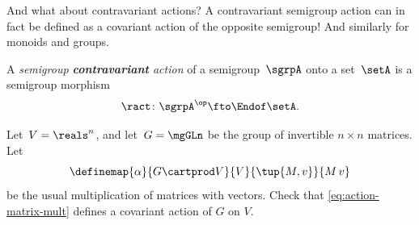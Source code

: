And what about contravariant actions? A contravariant semigroup action can in fact be defined as a covariant action of the opposite semigroup! And similarly for monoids and groups.

\begin{ctdefinition}
    \label{def:semigroup-cont-action}
    A \emph{semigroup \textbf{contravariant} action} of a semigroup~$\sgrpA$ onto a set~$\setA$ is a semigroup morphism
    \begin{equation}
        \ract \colon \sgrpA^{\op} \fto \Endof\setA.
    \end{equation}
\end{ctdefinition}


\begin{gradedexercise}
    \label{ex:MatrixMultAction}
    Let~$V = \reals^n$, and let~$G = \mgGLn$ be the group of invertible $n \times n$ matrices.
    Let
    \begin{equation}
        \label{eq:action-matrix-mult}
        \definemap{
            \alpha
        }{
            G \cartprod V
        }{
            V
        }{
            \tup{M, v}
        }{
            M \, v
        }
    \end{equation}
    be the usual multiplication of matrices with vectors.
    Check that \cref{eq:action-matrix-mult} defines a covariant action of $G$ on $V$.
\end{gradedexercise}

